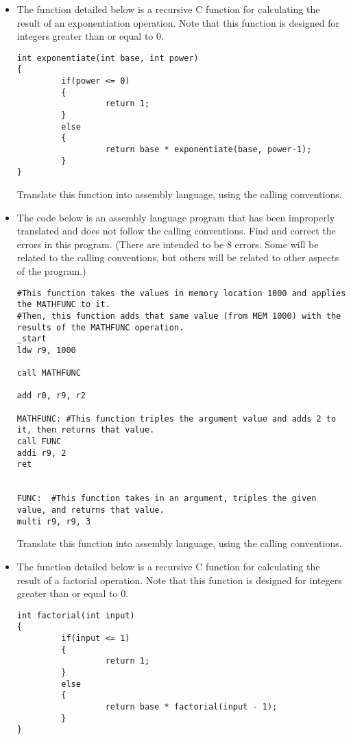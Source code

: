 \documentclass[10pt]{article}
\begin{document}
\begin{itemize}

\setlength\itemsep{10mm}


\item The function detailed below is a recursive C function for calculating the result of an exponentiation operation.  Note that this function is designed for integers greater than or equal to 0.
    \begin{verbatim}
int exponentiate(int base, int power)
{
         if(power <= 0)
         {
                  return 1;
         }
         else
         {
                  return base * exponentiate(base, power-1);
         }
}
    \end{verbatim}

Translate this function into assembly language, using the calling conventions.  
    \vspace{3in}
\newpage
\item The code below is an assembly language program that has been improperly translated and does not follow the calling conventions.  Find and correct the errors in this program.  (There are intended to be 8 errors.  Some will be related to the calling conventions, but others will be related to other aspects of the program.)
    \begin{verbatim}
#This function takes the values in memory location 1000 and applies the MATHFUNC to it.
#Then, this function adds that same value (from MEM 1000) with the results of the MATHFUNC operation.
_start
ldw r9, 1000

call MATHFUNC

add r0, r9, r2

MATHFUNC: #This function triples the argument value and adds 2 to it, then returns that value.
call FUNC
addi r9, 2
ret


FUNC:  #This function takes in an argument, triples the given value, and returns that value.
multi r9, r9, 3
    \end{verbatim}

Translate this function into assembly language, using the calling conventions. 


    \vspace{1in}

\item The function detailed below is a recursive C function for calculating the result of a factorial operation.  Note that this function is designed for integers greater than or equal to 0.
    \begin{verbatim}
int factorial(int input)
{
         if(input <= 1)
         {
                  return 1;
         }
         else
         {
                  return base * factorial(input - 1);
         }
}
    \end{verbatim}


\end{itemize}
\end{document}
